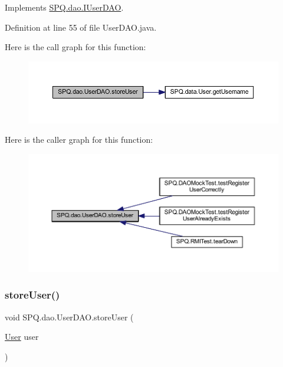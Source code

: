 Implements \mbox{\hyperlink{interface_s_p_q_1_1dao_1_1_i_user_d_a_o_a286f084c9e920d1ce196658ab63ab0af}{S\+P\+Q.\+dao.\+I\+User\+D\+AO}}.



Definition at line 55 of file User\+D\+A\+O.\+java.

Here is the call graph for this function\+:
\nopagebreak
\begin{figure}[H]
\begin{center}
\leavevmode
\includegraphics[width=350pt]{class_s_p_q_1_1dao_1_1_user_d_a_o_ad86d4148c7f3fd960fb32de7c68f3f6a_cgraph}
\end{center}
\end{figure}
Here is the caller graph for this function\+:
\nopagebreak
\begin{figure}[H]
\begin{center}
\leavevmode
\includegraphics[width=350pt]{class_s_p_q_1_1dao_1_1_user_d_a_o_ad86d4148c7f3fd960fb32de7c68f3f6a_icgraph}
\end{center}
\end{figure}
\mbox{\label{class_s_p_q_1_1dao_1_1_user_d_a_o_a9cc4105782c52054e71fa4938b55f7aa}} 
\subsubsection{\texorpdfstring{store\+User()}{storeUser()}\hspace{0.1cm}{\footnotesize\ttfamily [2/2]}}
{\footnotesize\ttfamily void S\+P\+Q.\+dao.\+User\+D\+A\+O.\+store\+User (\begin{DoxyParamCaption}\item[{\mbox{\hyperlink{class_s_p_q_1_1data_1_1_user}{User}}}]{user }\end{DoxyParamCaption})}



